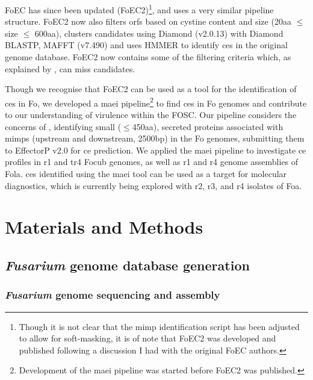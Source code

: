 FoEC has since been updated \parencite{FoEC2} (FoEC2)\footnote{Though it is not clear that the \ac{mimp} identification script has been adjusted to allow for soft-masking, it is of note that FoEC2 was developed and published following a discussion I had with the original FoEC authors.}, and uses a very similar pipeline structure. FoEC2 now also filters \acp{orf} based on cystine content and size (20aa $\leq$ size $\leq$ 600aa), clusters candidates using Diamond (v2.0.13) with Diamond BLASTP, MAFFT (v7.490) \parencite{Katoh2019} and uses HMMER \parencite{Eddy2011} to identify \acp{ce} in the original genome database. FoEC2 now contains some of the filtering criteria which, as explained by \textcite{Sperschneider2015, LoPresti2015, Todd2022}, can miss candidates. 

Though we recognise that FoEC2 can be used as a tool for the identification of \acp{ce} in \ac{Fo}, we developed a \ac{maei} pipeline\footnote{Development of the \ac{maei} pipeline was started before FoEC2 was published.} to find \acp{ce} in \ac{Fo} genomes and contribute to our understanding of virulence within the \ac{FOSC}. Our pipeline considers the concerns of \textcite{Sperschneider2015, Todd2022}, identifying small ($\leq$450aa), secreted proteins associated with \acp{mimp} (upstream and downstream, 2500bp) in the \ac{Fo} genomes, submitting them to EffectorP v2.0 for \ac{ce} prediction. We applied the \ac{maei} pipeline to investigate \ac{ce} profiles in \ac{r1} and \ac{tr4} \ac{Focub} genomes, as well as \ac{r1} and \ac{r4} genome assemblies of \ac{Fola}. \acp{ce} identified using the \ac{maei} tool can be used as a target for molecular diagnostics, which is currently being explored with \ac{r2}, \ac{r3}, and \ac{r4} isolates of \ac{Foa}. 

\newpage
\section{Materials and Methods}

\subsection{\textit{Fusarium} genome database generation}\label{chap3:fusariumdb}

\subsubsection{\textit{Fusarium} genome sequencing and assembly}

